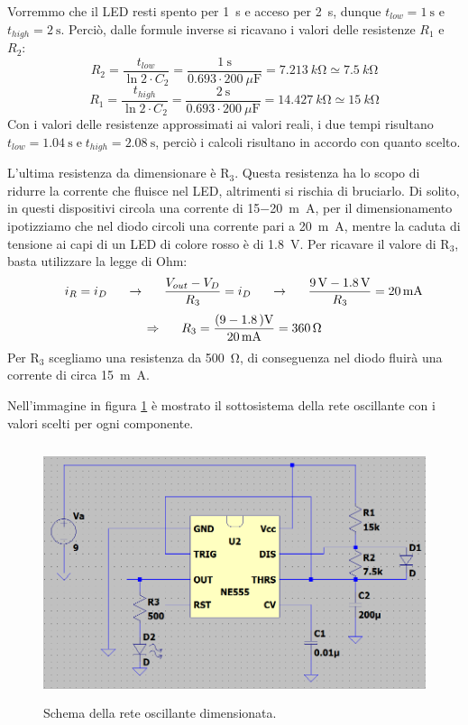 \documentclass{report}
\begin{document}
Vorremmo che il LED resti spento per \SI{1}{\second} e acceso per \SI{2}{\second}, dunque $\displaystyle{t_{low}=\SI{1}{\second}}$ e $\displaystyle{t_{high}=\SI{2}{\second}}$. Perciò, dalle formule inverse si ricavano i valori delle resistenze $R_1$ e $R_2$:
\\$$R_2 = \frac{t_{low}}{\ln2\cdot C_2}=\frac{\SI{1}{\second}}{0.693\cdot\SI{200}{\mu\farad}}=\SI{7.213}{k\ohm}\simeq\SI{7.5}{k\ohm}$$
$$R_1 = \frac{t_{high}}{\ln2\cdot C_2}=\frac{\SI{2}{\second}}{0.693\cdot\SI{200}{\mu\farad}}=\SI{14.427}{k\ohm}\simeq\SI{15}{k\ohm}$$
Con i valori delle resistenze approssimati ai valori reali, i due tempi risultano $\displaystyle{t_{low}=\SI{1.04}{\second}\mathrm{\;e\;}t_{high}=\SI{2.08}{\second}}$, perciò i calcoli risultano in accordo con quanto scelto. \par
L'ultima resistenza da dimensionare è $\mathrm{R_3}$. Questa resistenza ha lo scopo di ridurre la corrente che fluisce nel LED, altrimenti si rischia di bruciarlo. Di solito, in questi dispositivi circola una corrente di 15\SI{-20}{m\ampere}, per il dimensionamento ipotizziamo che nel diodo circoli una corrente pari a \SI{20}{m\ampere}, mentre la caduta di tensione ai capi di un LED di colore rosso è di \SI{1.8}{\volt}. Per ricavare il valore di $\mathrm{R_3}$, basta utilizzare la legge di Ohm:
$$\indent i_R = i_D\indent\rightarrow\indent \frac{V_{out}-V_D}{R_3}=i_D\indent\rightarrow\indent\frac{\SI{9}{\volt}-\SI{1.8}{\volt}}{R_3}=\SI{20}{m\ampere}$$
$$\Rightarrow\indent R_3=\frac{(9\SI{-1.8}{)\volt}}{\SI{20}{m\ampere}}=\SI{360}{\ohm}$$
Per $\mathrm{R_3}$ scegliamo una resistenza da \SI{500}{\ohm}, di conseguenza nel diodo fluirà una corrente di circa \SI{15}{m\ampere}. \par 
Nell'immagine in figura \ref{figura:dim555} è mostrato il sottosistema della rete oscillante con i valori scelti per ogni componente. 
\begin{figure}[h!]
	\centering
	\includegraphics[height=7.5cm]{immagini/dim555}
	\caption{Schema della rete oscillante dimensionata.} 
	\label{figura:dim555}
\end{figure}
\end{document}
